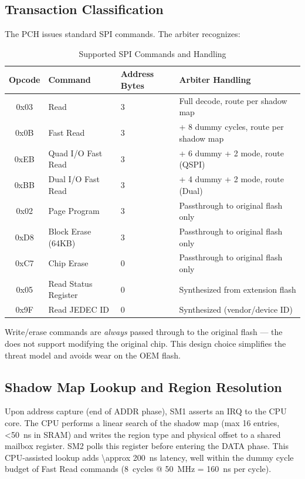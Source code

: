 \subsection{Transaction Classification}
The \ac{PCH} issues standard \ac{SPI} commands. The arbiter recognizes:
\begin{table}[h]
\centering
\caption{Supported \ac{SPI} Commands and Handling}
\label{tab:spi_commands}
\begin{tabular}{@{}clll@{}}
\toprule
\textbf{Opcode} & \textbf{Command} & \textbf{Address Bytes} & \textbf{Arbiter Handling} \\
\midrule
0x03  & Read                      & 3 & Full decode, route per shadow map \\
0x0B  & Fast Read                 & 3 & + 8 dummy cycles, route per shadow map \\
0xEB  & Quad I/O Fast Read        & 3 & + 6 dummy + 2 mode, route (QSPI) \\
0xBB  & Dual I/O Fast Read        & 3 & + 4 dummy + 2 mode, route (Dual) \\
0x02  & Page Program              & 3 & Passthrough to original flash only \\
0xD8  & Block Erase (64KB)        & 3 & Passthrough to original flash only \\
0xC7  & Chip Erase                & 0 & Passthrough to original flash only \\
0x05  & Read Status Register      & 0 & Synthesized from extension flash \\
0x9F  & Read JEDEC ID             & 0 & Synthesized (vendor/device ID) \\
\bottomrule
\end{tabular}
\end{table}

Write/erase commands are \textit{always} passed through to the original flash --- the \vbfc does not support modifying the original chip. This design choice simplifies the threat model and avoids wear on the OEM flash.

\subsection{Shadow Map Lookup and Region Resolution}
Upon address capture (end of ADDR phase), SM1 asserts an IRQ to the CPU core. The CPU performs a linear search of the shadow map (max 16 entries, \SI{<50}{ns} in \ac{SRAM}) and writes the region type and physical offset to a shared mailbox register. SM2 polls this register before entering the DATA phase. This CPU-assisted lookup adds \SI{\approx 200}{ns} latency, well within the dummy cycle budget of Fast Read commands (\SI{8}{cycles} @ \SI{50}{MHz} = \SI{160}{ns} per cycle).

